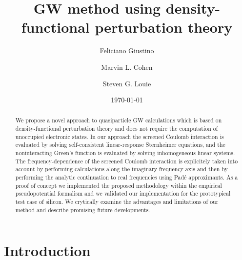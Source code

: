 \documentclass[twocolumn,prb,showpacs,superscriptaddress]{revtex4}
\begin{document}
\title{GW method using density-functional perturbation theory}

\author{Feliciano Giustino}
\author{Marvin L. Cohen}
\author{Steven G. Louie}
\date{\today}

\begin{abstract}
We propose a novel approach to quasiparticle GW calculations which 
is based on density-functional perturbation theory and
does not require the computation of unoccupied electronic states. In our approach 
the screened Coulomb interaction
is evaluated by solving self-consistent linear-response Sternheimer equations,
and the noninteracting Green's function is evaluated by solving inhomogeneous 
linear systems. The frequency-dependence of the screened Coulomb interaction 
is explicitely taken into account by performing calculations along the imaginary
frequency axis and then by performing the analytic continuation to real frequencies
using Pad\'e approximants. As a proof of concept we implemented the proposed methodology
within the empirical pseudopotential formalism and we validated our implementation
for the prototypical test case of silicon. We crytically examine the advantages and
limitations of our method and describe promising future developments.
\end{abstract}


\maketitle

\section{Introduction}
\end{document}
